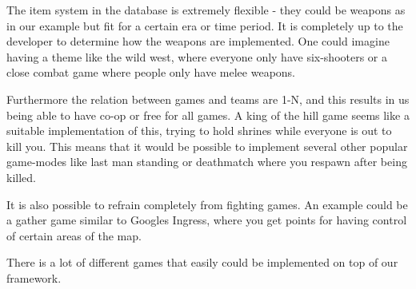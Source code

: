 The item system in the database is extremely flexible - they could be weapons as in our example but fit for a certain era or time period. It is completely up to the developer to determine how the weapons are implemented. One could imagine having a theme like the wild west, where everyone only have six-shooters or a close combat game where people only have melee weapons. 

Furthermore the relation between games and teams are 1-N, and this results in us being able to have co-op or free for all games. A king of the hill game seems like a suitable implementation of this, trying to hold shrines while everyone is out to kill you. This means that it would be possible to implement several other popular game-modes like last man standing or deathmatch where you respawn after being killed.

It is also possible to refrain completely from fighting games. An example could be a gather game similar to Googles Ingress, where you get points for having control of certain areas of the map.

There is a lot of different games that easily could be implemented on top of our framework.



